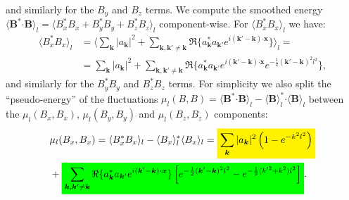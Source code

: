 \documentclass[]{article}
\newcommand{\mathcolorbox}[2]{\colorbox{#1}{$\displaystyle #2$}}
\newcommand{\bcdot}{\bm{\cdot}}
\begin{document}
%
and similarly for the $B_y$ and $B_z$ terms.
We compute the smoothed energy $\langle \bm B^* \bcdot\bm B \rangle_l = \langle B_x^* B_x + B_y^* B_y + B_z^* B_z \rangle_l$ component-wise. For $\langle B_x^* B_x \rangle_l$ we have:
%
\begin{align}
	\langle B_x^* B_x \rangle_l &= \langle \sum_{\bm k} |a_{\bm k}|^2  +  \sum_{\bm k, \bm k' \neq \bm k} \Re \lbrace a_{\bm k}^* a_{\bm k'} e^{i (\bm k' - \bm k) \bcdot\bm x } \rbrace  \rangle_l = \nonumber \\
	&= \sum_{\bm k} |a_{\bm k}|^2 +  \sum_{\bm k, \bm k' \neq \bm k} \Re \lbrace a_{\bm k}^* a_{\bm k'} e^{i (\bm k' - \bm k) \bcdot\bm x } e^{-\frac{1}{2} (\bm k' - \bm k)^2 l^2} \rbrace,
\end{align}
%
and similarly for the $B_y^* B_y$ and $B_z^* B_z$ terms.
%
For simplicity we also split the ``pseudo-energy'' of the fluctuations $\mu_l(B,B) = \langle \bm B^* \bcdot\bm B \rangle_l - \langle \bm B \rangle_l^* \bcdot\langle \bm B \rangle_l$ between the $\mu_l(B_x,B_x)$, $\mu_l(B_y,B_y)$ and $\mu_l(B_z,B_z)$ components:
%
\begin{align}\label{eq:pseudo-energy-Bx}
	&\mu_l(B_x,B_x) = \langle B_x^* B_x \rangle_l - \langle B_x \rangle_l^* \langle B_x \rangle_l = \mathcolorbox{yellow}{\sum_{\bm k} |a_{\bm k}|^2 \left( 1 -  e^{- k^2 l^2} \right)} \nonumber \\
	& + \mathcolorbox{green}{ \sum_{\bm k, \bm k' \neq \bm k} \Re \lbrace a_{\bm k}^* a_{\bm k'} e^{i (\bm k' - \bm k) \bcdot\bm x } \rbrace \left[ e^{-\frac{1}{2} (\bm k' - \bm k)^2 l^2} - e^{-\frac{1}{2} (k'^2 + k^2) l^2}\right]} .
\end{align}
\end{document}
